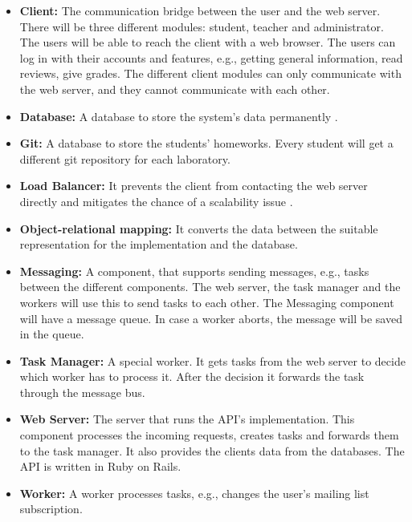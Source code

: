 \begin{itemize}
	\item \textbf{Client:} The communication bridge between the user and the web server. There will be three different modules: student, teacher and administrator. The users will be able to reach the client with a web browser. The users can log in with their accounts and features, e.g., getting general information, read reviews, give grades. The different client modules can only communicate with the web server, and they cannot communicate with each other. 
	\item \textbf{Database:} A database to store the system's data permanently . 
	\item \textbf{Git:} A database to store the students' homeworks. Every student will get a different git repository for each laboratory.
	\item \textbf{Load Balancer:} It prevents the client from contacting the web server directly and mitigates the chance of a scalability issue . 
	\item \textbf{Object-relational mapping:} It converts the data between the suitable representation for the implementation and the database. 
	\item \textbf{Messaging:} A component, that supports sending messages, e.g., tasks between the different components. The web server, the task manager and the workers will use this to send tasks to each other. The Messaging component will have a message queue. In case a worker aborts, the message will be saved in the queue.
	\item \textbf{Task Manager:} A special worker. It gets tasks from the web server to decide which worker has to process it. After the decision it forwards the task through the message bus.
	\item \textbf{Web Server:} The server that runs the API's implementation. This component processes the incoming requests, creates tasks and forwards them to the task manager. It also provides the clients data from the databases. The API is written in Ruby on Rails. 
	\item \textbf{Worker:} A worker processes tasks, e.g., changes the user's mailing list subscription.
\end{itemize}

